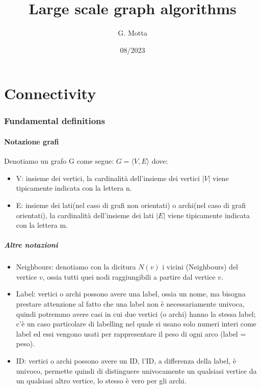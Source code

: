 \documentclass[12pt,a4paper]{article}
\title{Large scale graph algorithms}
\author{G. Motta}
\date{08/2023}
\begin{document}
\maketitle
\tableofcontents

\pagebreak
\part{Connectivity}

\section{Fundamental definitions}

\subsection{Notazione grafi}
Denotiamo un grafo G come segue: $G = \langle V, E\rangle$ dove:
\begin{itemize}
\item V: insieme dei vertici, la cardinalità dell'insieme dei vertici $\vert V \vert$ viene tipicamente indicata con la lettera n.
\item E: insieme dei lati(nel caso di grafi non orientati) o archi(nel caso di grafi orientati), la cardinalità dell'insieme dei lati $\vert E \vert$ viene tipicamente indicata con la lettera m.
\end{itemize}

\subsubsection{Altre notazioni}
\begin{itemize}
\item Neighbours: denotiamo con la dicitura $N(v)$ i vicini (Neighbours) del vertice $v$, ossia tutti quei nodi raggiungibili a partire dal vertice $v$.
\item Label: vertici o archi possono avere una label, ossia un nome, ma bisogna prestare attenzione al fatto che una label non è necessariamente univoca, quindi potremmo avere casi in cui due vertici (o archi) hanno la stessa label; c'è un caso particolare di labelling nel quale si usano solo numeri interi come label ed essi vengono usati per rappresentare il peso di ogni arco (label = peso).

\item ID: vertici o archi possono avere un ID, l'ID, a differenza della label, è univoco, permette quindi di distinguere univocamente un qualsiasi vertice da un qualsiasi altro vertice, lo stesso è vero per gli archi.
\end{itemize}
\end{document}
